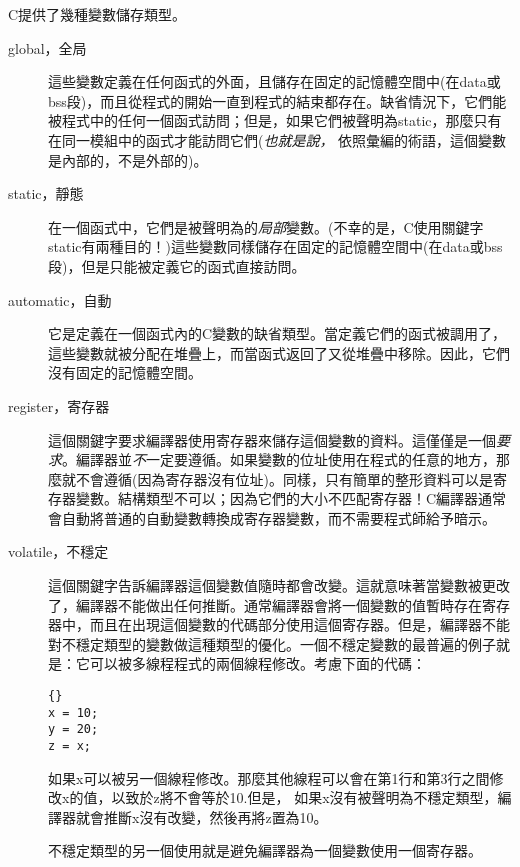 C提供了幾種變數儲存類型。
\begin{description}
\item[global，全局]
這些變數定義在任何函式的外面，且儲存在固定的記憶體空間中(在{\code data}或{\code
bss}段)，而且從程式的開始一直到程式的結束都存在。缺省情況下，它們能被程式中的任何一個函式訪問；但是，如果它們被聲明為{\code static}，那麼只有在同一模組中的函式才能訪問它們(\emph{也就是說，} 依照彙編的術語，這個變數是內部的，不是外部的)。

\item[static，靜態]
在一個函式中，它們是被聲明為{}的\emph{局部}變數。(不幸的是，C使用關鍵字{\code
static}有兩種目的！)這些變數同樣儲存在固定的記憶體空間中(在{\code data}或{\code bss}段)，但是只能被定義它的函式直接訪問。

\item[automatic，自動]
它是定義在一個函式內的C變數的缺省類型。當定義它們的函式被調用了，這些變數就被分配在堆疊上，而當函式返回了又從堆疊中移除。因此，它們沒有固定的記憶體空間。

\item[register，寄存器]
這個關鍵字要求編譯器使用寄存器來儲存這個變數的資料。這僅僅是一個\emph{要求}。編譯器並\emph{不}一定要遵循。如果變數的位址使用在程式的任意的地方，那麼就不會遵循(因為寄存器沒有位址)。同樣，只有簡單的整形資料可以是寄存器變數。結構類型不可以；因為它們的大小不匹配寄存器！C編譯器通常會自動將普通的自動變數轉換成寄存器變數，而不需要程式師給予暗示。

\item[volatile，不穩定]
這個關鍵字告訴編譯器這個變數值隨時都會改變。這就意味著當變數被更改了，編譯器不能做出任何推斷。通常編譯器會將一個變數的值暫時存在寄存器中，而且在出現這個變數的代碼部分使用這個寄存器。但是，編譯器不能對{\code 不穩定}類型的變數做這種類型的優化。一個不穩定變數的最普遍的例子就是：它可以被多線程程式的兩個線程修改。考慮下面的代碼：
\begin{lstlisting}{}
x = 10;
y = 20;
z = x;
\end{lstlisting}
如果{\code x}可以被另一個線程修改。那麼其他線程可以會在第1行和第3行之間修改{\code x}的值，以致於{\code z}將不會等於10.但是， 如果{\code x}沒有被聲明為不穩定類型，編譯器就會推斷{\code x}沒有改變，然後再將{\code z}置為10。

{\code 不穩定類型}的另一個使用就是避免編譯器為一個變數使用一個寄存器。

\end{description}

